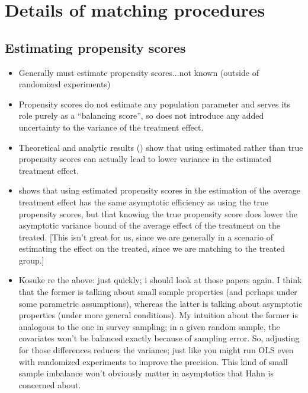 \documentclass[11pt,titlepage]{article}
\begin{document}
\section{Details of matching procedures}
\subsection{Estimating propensity scores}
\label{pscorest}
\begin{itemize}
\item Generally must estimate propensity scores...not known (outside
  of randomized experiments)
\item Propensity scores do not estimate any population parameter and
  serves its role purely as a ``balancing score'', so does not
  introduce any added uncertainty to the variance of the treatment
  effect.
\item Theoretical and analytic results (\cite{RubTho92b, RubTho96,
    HilRubTho99}) show that using estimated rather than true
  propensity scores can actually lead to lower variance in the
  estimated treatment effect.
\item \cite{Hahn98} shows that using estimated propensity scores in
  the estimation of the average treatment effect has the same
  asymptotic efficiency as using the true propensity scores, but that
  knowing the true propensity score does lower the asymptotic variance
  bound of the average effect of the treatment on the treated.  [This
  isn't great for us, since we are generally in a scenario of
  estimating the effect on the treated, since we are matching to the
  treated group.]
\item Kosuke re the above: just quickly; i should look at those papers
  again. I think that the former is talking about small sample
  properties (and perhaps under some parametric assumptions), whereas
  the latter is talking about asymptotic properties (under more
  general conditions).  My intuition about the former is analogous to
  the one in survey sampling; in a given random sample, the covariates
  won't be balanced exactly because of sampling error. So, adjusting
  for those differences reduces the variance; just like you might run
  OLS even with randomized experiments to improve the precision. This
  kind of small sample imbalance won't obviously matter in asymptotics
  that Hahn is concerned about.
\end{itemize}
\end{document}
